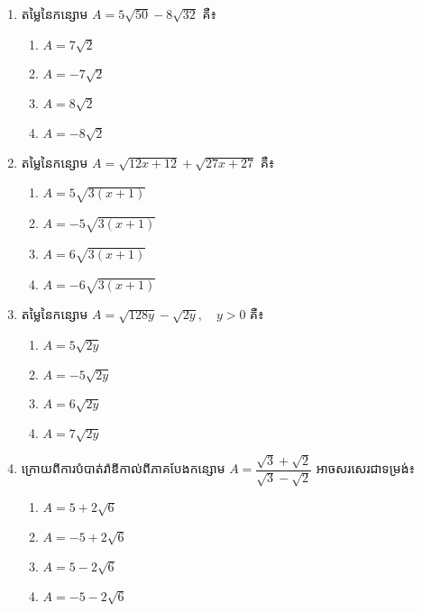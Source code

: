 \begin{enumerate}
\item តម្លៃនៃកន្សោម $A=5\sqrt{50}-8\sqrt{32}$ គឺ៖
\begin{multicols}{4}
\begin{enumerate}[label=\alph*.]
	\item $A=7\sqrt{2}$
	\item $A=-7\sqrt{2}$
	\item $A=8\sqrt{2}$
	\item $A=-8\sqrt{2}$
\end{enumerate}
\end{multicols}

\item តម្លៃនៃកន្សោម $A=\sqrt{12x+12}+\sqrt{27x+27}$ គឺ៖
\begin{multicols}{2}
\begin{enumerate}[label=\alph*.]
	\item $A=5\sqrt{3(x+1)}$
	\item $A=-5\sqrt{3(x+1)}$
	\item $A=6\sqrt{3(x+1)}$
	\item $A=-6\sqrt{3(x+1)}$
\end{enumerate}
\end{multicols}

\item តម្លៃនៃកន្សោម $A=\sqrt{128y}-\sqrt{2y},\quad y>0$ គឺ៖
\begin{multicols}{2}
\begin{enumerate}[label=\alph*.]
	\item $A=5\sqrt{2y}$
	\item $A=-5\sqrt{2y}$
	\item $A=6\sqrt{2y}$
	\item $A=7\sqrt{2y}$
\end{enumerate}
\end{multicols}

\item ក្រោយពីការបំបាត់រ៉ាឌីកាល់ពីភាគបែងកន្សោម $A=\dfrac{\sqrt{3}+\sqrt{2}}{\sqrt{3}-\sqrt{2}}$ អាចសរសេរជាទម្រង់៖
\begin{multicols}{2}
\begin{enumerate}[label=\alph*.]
	\item $A=5+2\sqrt{6}$
	\item  $A=-5+2\sqrt{6}$
	\item $A=5-2\sqrt{6}$
	\item  $A=-5-2\sqrt{6}$
\end{enumerate}
\end{multicols}


\end{enumerate}
